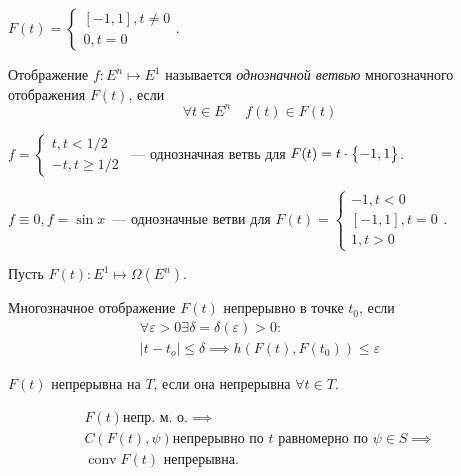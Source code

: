 \begin{exmp}
    $F(t) = \begin{cases}
        [-1, 1], t \neq 0 \\
        0, t = 0
    \end{cases}$.
\end{exmp}

\begin{defn}
    Отображение $f\colon E^n \mapsto E^1$ называется \textit{однозначной ветвью}
    многозначного отображения $F(t)$, если
    \begin{equation*}
        \forall t \in E^n \quad f(t) \in F(t)
    \end{equation*}
\end{defn}

\begin{exmp}
    $f = \begin{cases}
        t, t < 1/2 \\
        -t, t \geqslant 1/2
    \end{cases}$~--- однозначная ветвь для $F(t) = t \cdot \bigl\{ -1, 1 \bigr\}$.
\end{exmp}

\begin{exmp}
    $f \equiv 0, f = \sin x$~--- однозначные ветви для $F(t) = \begin{cases}
        -1, t < 0 \\
        [-1, 1], t = 0 \\
        1, t > 0
    \end{cases}$.
\end{exmp}

Пусть $F(t)\colon E^1 \mapsto \Omega(E^n)$.
\begin{defn}
    Многозначное отображение $F(t)$ непрерывно в точке $t_0$, если
    \begin{align*}
        \forall \varepsilon > 0 \exists \delta = \delta(\varepsilon) > 0\colon \\
        |t - t_o| \leqslant \delta \implies h(F(t), F(t_0)) \leqslant \varepsilon
    \end{align*}
\end{defn}

\begin{defn}
    $F(t)$ непрерывна на $T$, если она непрерывна $\forall t \in T$.
\end{defn}

\begin{thm*}
    \begin{multline*}
        F(t) \text{непр. м. о.} \implies \\
        C(F(t), \psi) \text{непрерывно по } t \text{ равномерно по } \psi \in S \implies \\
        \operatorname{conv} F(t) \text{ непрерывна.}
    \end{multline*}
\end{thm*}


